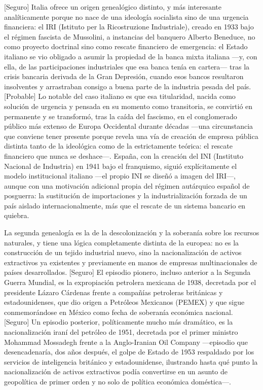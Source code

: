 \documentclass[10pt,a4paper]{article}
\begin{document}
[Seguro] Italia ofrece un origen genealógico distinto, y más interesante analíticamente porque no nace de una ideología socialista sino de una urgencia financiera: el IRI (Istituto per la Ricostruzione Industriale), creado en 1933 bajo el régimen fascista de Mussolini, a instancias del banquero Alberto Beneduce, no como proyecto doctrinal sino como rescate financiero de emergencia: el Estado italiano se vio obligado a asumir la propiedad de la banca mixta italiana —y, con ella, de las participaciones industriales que esa banca tenía en cartera— tras la crisis bancaria derivada de la Gran Depresión, cuando esos bancos resultaron insolventes y arrastraban consigo a buena parte de la industria pesada del país. [Probable] Lo notable del caso italiano es que esa titularidad, nacida como solución de urgencia y pensada en su momento como transitoria, se convirtió en permanente y se transformó, tras la caída del fascismo, en el conglomerado público más extenso de Europa Occidental durante décadas —una circunstancia que conviene tener presente porque revela una vía de creación de empresa pública distinta tanto de la ideológica como de la estrictamente teórica: el rescate financiero que nunca se deshace—. España, con la creación del INI (Instituto Nacional de Industria) en 1941 bajo el franquismo, siguió explícitamente el modelo institucional italiano —el propio INI se diseñó a imagen del IRI—, aunque con una motivación adicional propia del régimen autárquico español de posguerra: la sustitución de importaciones y la industrialización forzada de un país aislado internacionalmente, más que el rescate de un sistema bancario en quiebra.

La segunda genealogía es la de la descolonización y la soberanía sobre los recursos naturales, y tiene una lógica completamente distinta de la europea: no es la construcción de un tejido industrial nuevo, sino la nacionalización de activos extractivos ya existentes y previamente en manos de empresas multinacionales de países desarrollados. [Seguro] El episodio pionero, incluso anterior a la Segunda Guerra Mundial, es la expropiación petrolera mexicana de 1938, decretada por el presidente Lázaro Cárdenas frente a compañías petroleras británicas y estadounidenses, que dio origen a Petróleos Mexicanos (PEMEX) y que sigue conmemorándose en México como fecha de soberanía económica nacional. [Seguro] Un episodio posterior, políticamente mucho más dramático, es la nacionalización iraní del petróleo de 1951, decretada por el primer ministro Mohammad Mossadegh frente a la Anglo-Iranian Oil Company —episodio que desencadenaría, dos años después, el golpe de Estado de 1953 respaldado por los servicios de inteligencia británico y estadounidense, ilustrando hasta qué punto la nacionalización de activos extractivos podía convertirse en un asunto de geopolítica de primer orden y no solo de política económica doméstica—.
\end{document}
